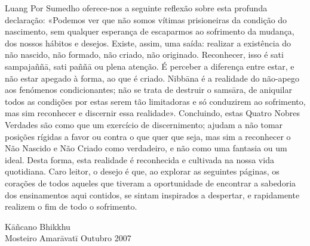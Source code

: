 Luang Por Sumedho oferece-nos a seguinte reflexão
sobre esta profunda declaração: «Podemos ver que não somos
vítimas prisioneiras da condição do nascimento, sem qualquer esperança de escaparmos ao sofrimento da mudança, dos
nossos hábitos e desejos. Existe, assim, uma saída: realizar a
existência do não nascido, não formado, não criado, não
originado. Reconhecer, isso é sati sampajaññā, sati paññā ou
plena atenção. É perceber a diferença entre estar, e não estar
apegado à forma, ao que é criado. Nibbāna é a realidade do
não-apego aos fenómenos condicionantes; não se trata de
destruir o samsāra, de aniquilar todos as condições por estas
serem tão limitadoras e só conduzirem ao sofrimento, mas
sim reconhecer e discernir essa realidade».
Concluindo, estas Quatro Nobres Verdades são como
que um exercício de discernimento; ajudam a não tomar
posições rígidas a favor ou contra o que quer que seja, mas
sim a reconhecer o Não Nascido e Não Criado como verdadeiro, e não como uma fantasia ou um ideal. Desta forma, esta
realidade é reconhecida e cultivada na nossa vida quotidiana.
Caro leitor, o desejo é que, ao explorar as seguintes páginas, os corações de todos aqueles que tiveram a oportunidade
de encontrar a sabedoria dos ensinamentos aqui contidos, se
sintam inspirados a despertar, e rapidamente realizem o fim
de todo o sofrimento.

\bigskip

{\raggedleft
  Kāñcano Bhikkhu\\
  Mosteiro Amarāvatī
  Outubro 2007
\par}

